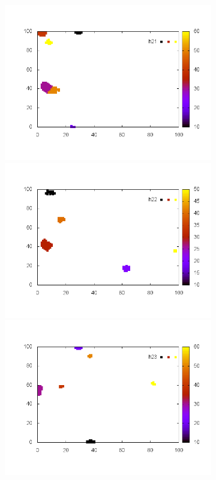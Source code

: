 \documentclass[10pt,a4paper]{article}
\begin{document}
\begin{figure}
\begin{subfigure}[b]{1\textwidth}
\end{subfigure}
\begin{subfigure}[b]{1\textwidth}
\includegraphics[scale=.3]{./img/SCC_Stable3/cut90p/21.png}
\includegraphics[scale=.3]{./img/SCC_Stable3/cut90p/22.png}
\includegraphics[scale=.3]{./img/SCC_Stable3/cut90p/23.png}

\end{subfigure}
\end{figure}
\end{document}
